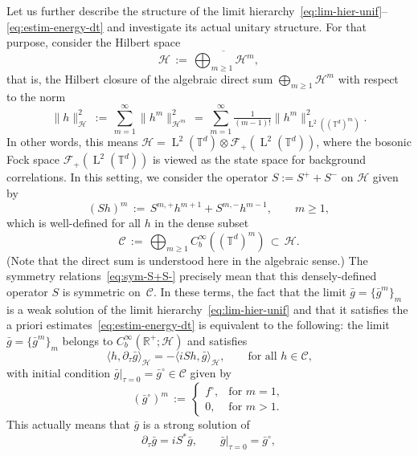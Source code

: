 \documentclass[a4paper,11pt,reqno,noindent]{amsart}
\theoremstyle{plain}
\numberwithin{equation}{section}
\newcommand{\R}{\mathbb R}
\newcommand{\T}{\mathbb T}
\newcommand{\Cc}{\mathcal C}
\newcommand{\Hc}{\mathcal H}
\newcommand{\3}{|\!|\!|}
\newcommand{\Ld}{\operatorname{L}}
\begin{document}
Let us further describe the structure of the limit hierarchy~\eqref{eq:lim-hier-unif}--\eqref{eq:estim-energy-dt} and investigate its actual unitary structure.
For that purpose, consider the Hilbert space
\begin{equation}\label{eq:HilbertHc}
\Hc\,:=\,\overline{\textstyle\bigoplus_{m\ge1}\Hc^m},
\end{equation}
that is, the Hilbert closure of the algebraic direct sum $\bigoplus_{m\ge1}\Hc^m$ with respect to the norm
\[\|h\|_{\Hc}^2\,:=\,\sum_{m=1}^\infty\|h^m\|_{\Hc^m}^2\,=\,\sum_{m=1}^\infty\tfrac1{(m-1)!}\|h^m\|_{\Ld^2((\T^d)^m)}^2.\]
In other words, this means $\Hc=\Ld^2(\T^d)\otimes\mathcal F_+(\Ld^2(\T^d))$,
where the bosonic Fock space $\mathcal F_+(\Ld^2(\T^d))$ is viewed as the state space for background correlations.
In this setting, we consider the operator $S:=S^++S^-$ on $\Hc$ given by
\begin{equation}\label{eq:def-S-oplim}
(Sh)^m\,:=\,S^{m,+}h^{m+1}+S^{m,-}h^{m-1},\qquad m\ge1,
\end{equation}
which is well-defined for all $h$ in the dense subset
\begin{equation}\label{eq:core-def}
\textstyle\Cc\,:=\,\bigoplus_{m\ge1}C^\infty_b((\T^d)^m)\,\subset\,\Hc.
\end{equation}
(Note that the direct sum is understood here in the algebraic sense.)
The symmetry relations~\eqref{eq:sym-S+S-}
precisely mean that this densely-defined operator $S$ is symmetric on~$\Cc$.
In these terms, the fact that the limit $\bar g=\{\bar g^m\}_m$ is a weak solution of the limit hierarchy~\eqref{eq:lim-hier-unif} and that it satisfies the a priori estimates~\eqref{eq:estim-energy-dt} is equivalent to the following: the limit $\bar g=\{\bar g^m\}_m$ belongs to $C^\infty_b(\R^+;\Hc)$
and satisfies
\begin{equation*}
\langle h,\partial_\tau\bar g\rangle_\Hc=-\langle iSh,\bar g\rangle_\Hc,\qquad\text{for all $h\in\Cc$,}
\end{equation*}
with initial condition $\bar g|_{\tau=0}=\bar g^\circ\in\Cc$ given by
\begin{equation}\label{eq:def-barg0}
(\bar g^\circ)^m\,:=\,\left\{\begin{array}{ll}
f^\circ,&\text{for $m=1$},\\
0,&\text{for $m>1$}.
\end{array}\right.
\end{equation}
This actually means that $\bar g$ is a strong solution of
\begin{equation}\label{eq:lim-hier-unif-rep}
\partial_\tau\bar g=iS^*\bar g,\qquad\bar g|_{\tau=0}=\bar g^\circ,
\end{equation}
\end{document}
